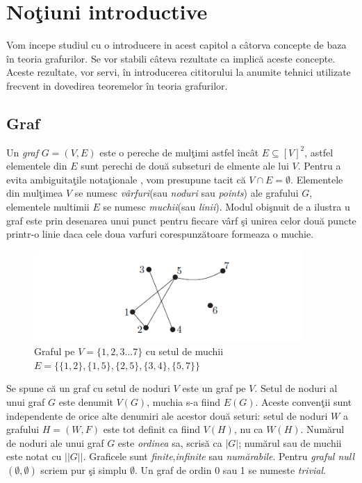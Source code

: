 \documentclass[11pt,a4paper]{report}
\begin{document}
	\chapter{No\c tiuni introductive}
	    
	
	Vom incepe studiul cu o introducere in acest capitol a c\^ atorva concepte de baza \^ in teoria grafurilor. Se vor stabili c\^ ateva rezultate ca implic\u a aceste concepte. Aceste rezultate, vor servi, \^ in introducerea cititorului la anumite tehnici utilizate frecvent in dovedirea teoremelor \^ in teoria grafurilor.
	
	\section{Graf}
	
    Un \textit{graf} $G=(V,E)$ este o pereche  de mul\c timi astfel \^ inc\^ at $E\subseteq [V]^2$, astfel elementele din $E$ sunt perechi de dou\u a subseturi de elmente ale lui $V$. Pentru a evita ambiguita\c tile nota\c tionale , vom presupune tacit c\u a $V\cap E=\emptyset$. Elementele din mul\c timea $V$ se numesc \textit{v\^ arfuri}(sau \textit{noduri} sau \textit{points}) ale grafului $G$, elementele multimii $E$ se numesc \textit{muchii}(sau \textit{linii}). Modul obi\c snuit de a ilustra u graf este prin desenarea unui punct pentru fiecare v\^ arf \c si unirea celor dou\u a puncte printr-o linie daca cele doua varfuri corespunz\u atoare formeaza o muchie.
	
	
	\begin{figure}[!hbt]
		\centering
		\includegraphics[width=10.2cm]{Figura1.png}
		\caption{Graful pe $V=\{ 1,2,3...7\}$ cu setul de muchii \centering \newline $E=\{ \{1,2\},\{1,5\},\{2,5\},\{3,4\},\{5,7\} \}$ }
		\end{figure}
	
	Se spune c\u a un graf cu setul de noduri $V$ este un graf pe $V$. Setul de noduri al unui graf $G$ este denumit $V(G)$, muchia s-a fiind $E(G)$. Aceste conven\c tii sunt independente de orice alte denumiri ale acestor dou\u a seturi: setul de noduri $W$ a grafului $H=(W,F)$ este tot definit ca fiind $V(H)$, nu ca $W(H)$. Num\u arul de noduri ale unui graf $G$ este \textit{ordinea} sa, scris\u a ca $|G|$; num\u arul sau de muchii este notat cu $||G||$. Graficele  sunt \textit{finite},\textit{infinite} sau \textit{num\u arabile}. Pentru \textit{graful null} $(\emptyset,\emptyset)$ scriem pur \c si simplu $\emptyset$. Un graf de ordin 0 sau 1 se numeste \textit{trivial}.
	
\end{document}

